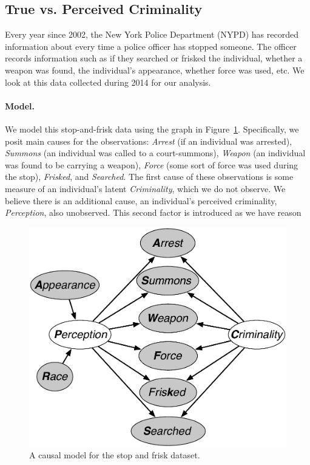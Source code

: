 \subsection{True vs. Perceived Criminality}
\label{sec:true-vs.-perceived}
Every year since 2002, the New York Police Department (NYPD) has recorded information about every time a police officer has stopped someone. The officer records information such as if they searched or frisked the individual, whether a weapon was found, the individual's appearance, whether force was used, etc. We look at this data collected during 2014 for our analysis.

\paragraph{Model.}
We model this stop-and-frisk data using the graph in Figure~\ref{figure.stop_and_frisk}. Specifically, we posit main causes for the observations: \emph{Arrest} (if an individual was arrested), \emph{Summons} (an individual was called to a court-summons), \emph{Weapon} (an individual was found to be carrying a weapon), \emph{Force} (some sort of force was used during the stop), \emph{Frisked}, and \emph{Searched}. The first cause of these observations is some measure of an individual's latent \emph{Criminality}, which we do not observe. We believe there is an additional cause, an individual's perceived criminality, \emph{Perception}, also unobserved. This second factor is introduced as we have reason


\begin{figure}[th]
\begin{center}
\vspace{-1ex}
\centerline{\includegraphics[width=\columnwidth]{stop_and_frisk_model3.pdf}}
\vspace{-2ex}
\caption{A causal model for the stop and frisk dataset.\label{figure.stop_and_frisk}\vspace{-4ex}}
\vspace{-2ex}
\end{center}
\end{figure}


